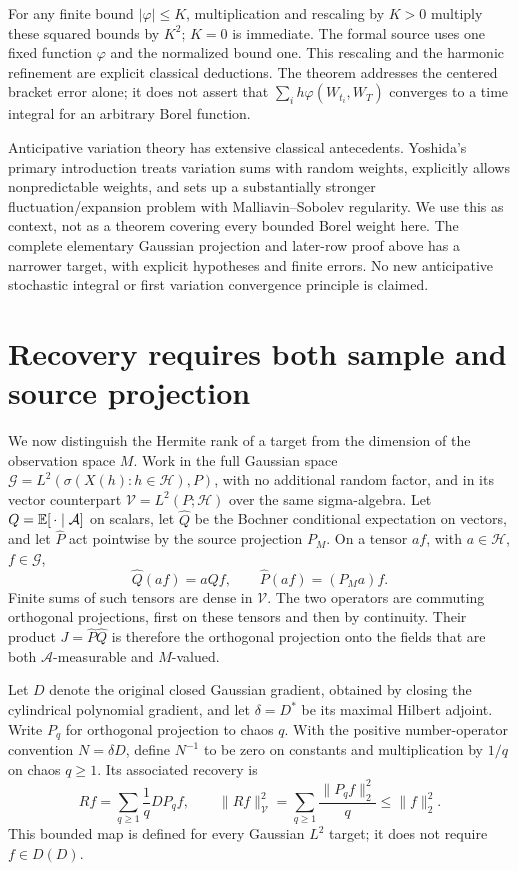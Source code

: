 \documentclass[11pt]{article}
\newcommand{\Hh}{\mathcal H}\newcommand{\U}{\mathcal U}
\begin{document}
For any finite bound $|\varphi|\le K$, multiplication and rescaling
by $K>0$ multiply these squared bounds by $K^2$; $K=0$ is immediate.
The formal source uses one fixed function $\varphi$ and the normalized
bound one. This rescaling and the harmonic refinement are explicit
classical deductions. The theorem addresses the centered bracket error
alone; it does not assert that
$\sum_i h\varphi(W_{t_i},W_T)$ converges to a time integral for an
arbitrary Borel function.

Anticipative variation theory has extensive classical antecedents.
Yoshida's primary introduction \cite{Yoshida} treats variation sums
with random weights, explicitly allows nonpredictable weights, and
sets up a substantially stronger fluctuation/expansion problem with
Malliavin--Sobolev regularity. We use this as context, not as a theorem
covering every bounded Borel weight here. The complete elementary
Gaussian projection and later-row proof above has a narrower target,
with explicit hypotheses and finite errors. No new anticipative
stochastic integral or first variation convergence principle is claimed.

\section{Recovery requires both sample and source projection}
We now distinguish the Hermite rank of a target from the dimension of
the observation space $M$. Work in the full Gaussian space
$\mathcal G=L^2(\sigma(X(h):h\in\Hh),P)$, with no additional random
factor, and in its vector counterpart $\mathcal V=L^2(P;\Hh)$ over
the same sigma-algebra. Let $Q=\mathbb E[\,\cdot\mid\mathcal A]$ on scalars,
let $\widehat Q$ be the Bochner conditional expectation on vectors,
and let $\widehat P$ act pointwise by the source projection $P_M$.
On a tensor $af$, with $a\in\Hh$, $f\in\mathcal G$,
\[
 \widehat Q(af)=aQf,\qquad \widehat P(af)=(P_Ma)f.
\]
Finite sums of such tensors are dense in $\mathcal V$. The two
operators are commuting orthogonal projections, first on these tensors
and then by continuity. Their product $J=\widehat P\widehat Q$ is
therefore the orthogonal projection onto the fields that are both
$\mathcal A$-measurable and $M$-valued.

Let $D$ denote the original closed Gaussian gradient, obtained by
closing the cylindrical polynomial gradient, and let $\delta=D^*$ be
its maximal Hilbert adjoint. Write $P_q$ for orthogonal projection to
chaos $q$. With the positive number-operator convention $N=\delta D$,
define $N^{-1}$ to be zero on constants and multiplication by $1/q$
on chaos $q\geq1$. Its associated recovery is
\begin{equation}\label{eq:Rdefinition}
 Rf=\sum_{q\geq1}\frac1q DP_qf,\qquad
 \|Rf\|_{\mathcal V}^2=\sum_{q\geq1}\frac{\|P_qf\|_2^2}{q}
 \leq\|f\|_2^2.
\end{equation}
This bounded map is defined for every Gaussian $L^2$ target; it does
not require $f\in D(D)$.
\end{document}
